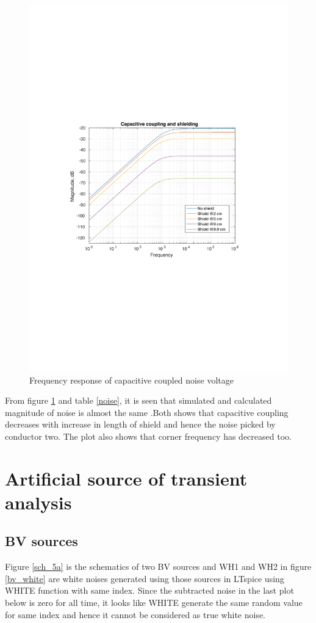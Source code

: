 \documentclass[12pt,a4paper,UKenglish]{article}
\begin{document}
\begin{figure} [H]
  \centering 
  \includegraphics[width=1\textwidth]{img/4.pdf} 
  \caption{Frequency response of capacitive coupled noise voltage}
  \label{two_con_ac} 
\end{figure}

From figure \ref{two_con_ac} and table \ref{noise}, it is seen that simulated and calculated magnitude of noise is almost the same .Both shows that capacitive coupling decreases with increase in length of shield and hence the noise picked by conductor two. The plot also shows that corner frequency has decreased too.

\section{Artificial source of transient analysis}
\subsection{BV sources}
 Figure \ref{sch_5a} is the schematics of two BV sources and WH1 and WH2 in figure \ref{bv_white} are white noises generated using those sources in LTspice using WHITE function with same index. Since the subtracted noise in the last plot below is zero for all time, it looks like WHITE generate the same random value for same index and hence it cannot be considered as true white noise.
\end{document}
